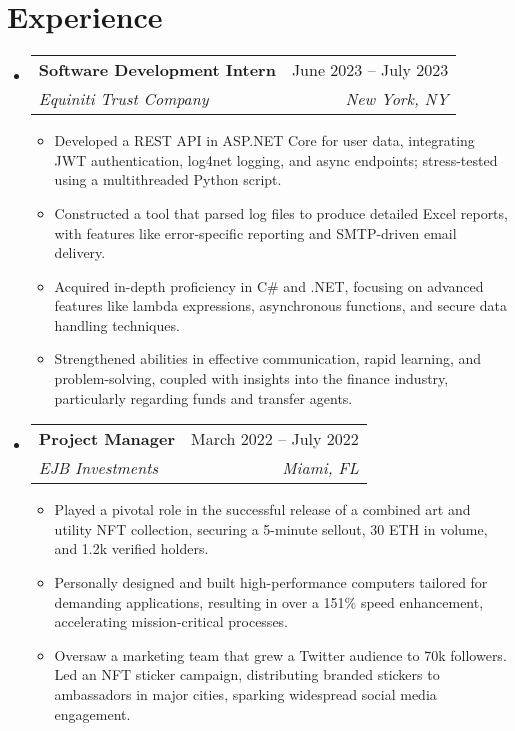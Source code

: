 \documentclass[letterpaper,11pt]{article}
\makeatletter
\newcommand{\resumeItem}[1]{
  \item\small{
    {#1 \vspace{-2pt}}
  }
}
\newcommand{\resumeSubheading}[4]{
  \vspace{-2pt}\item
    \begin{tabular*}{0.97\textwidth}[t]{l@{\extracolsep{\fill}}r}
      \textbf{#1} & #2 \\
      \textit{\small#3} & \textit{\small #4} \\
    \end{tabular*}\vspace{-7pt}
}
\newcommand{\resumeSubSubheading}[2]{
    \item
    \begin{tabular*}{0.97\textwidth}{l@{\extracolsep{\fill}}r}
      \textit{\small#1} & \textit{\small #2} \\
    \end{tabular*}\vspace{-7pt}
}
\newcommand{\resumeSubHeadingListStart}{\begin{itemize}[leftmargin=0.15in, label={}]}
\newcommand{\resumeSubHeadingListEnd}{\end{itemize}}
\newcommand{\resumeItemListStart}{\begin{itemize}}
\newcommand{\resumeItemListEnd}{\end{itemize}\vspace{-5pt}}
\makeatother
\begin{document}
\section{Experience}
  \resumeSubHeadingListStart

    \resumeSubheading
      {Software Development Intern}{June 2023 -- July 2023}
      {Equiniti Trust Company}{New York, NY}
      \resumeItemListStart
        \resumeItem{Developed a REST API in ASP.NET Core for user data, integrating JWT authentication, log4net logging, and async endpoints; stress-tested using a multithreaded Python script.}
        \resumeItem{Constructed a tool that parsed log files to produce detailed Excel reports, with features like error-specific reporting and SMTP-driven email delivery.}
        \resumeItem{Acquired in-depth proficiency in C\# and .NET, focusing on advanced features like lambda expressions, asynchronous functions, and secure data handling techniques.}
        \resumeItem{Strengthened abilities in effective communication, rapid learning, and problem-solving, coupled with insights into the finance industry, particularly regarding funds and transfer agents.}
      \resumeItemListEnd
      

    \resumeSubheading
      {Project Manager}{March 2022 -- July 2022}
      {EJB Investments}{Miami, FL}
      \resumeItemListStart
        \resumeItem{Played a pivotal role in the successful release of a combined art and utility NFT collection, securing a 5-minute sellout, 30 ETH in volume, and 1.2k verified holders.}
        \resumeItem{Personally designed and built high-performance computers tailored for demanding applications, resulting in over a 151\% speed enhancement, accelerating mission-critical processes.}
        \resumeItem{Oversaw a marketing team that grew a Twitter audience to 70k followers. Led an NFT sticker campaign, distributing branded stickers to ambassadors in major cities, sparking widespread social media engagement.}
    \resumeItemListEnd

  \resumeSubHeadingListEnd
\end{document}
